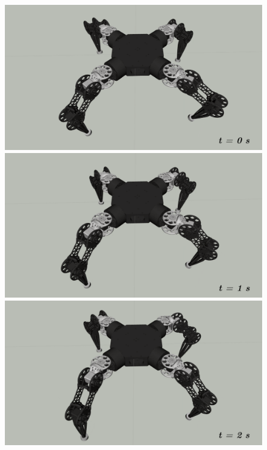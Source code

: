 \begin{figure}[t]
  \centering
  \begin{minipage}[b]{0.32\textwidth}
    \centering
    \includegraphics[clip, width=\linewidth]{./fig/chap4/gait/trot/t_step1.png}
  \end{minipage}
  \begin{minipage}[b]{0.32\textwidth}
    \centering
    \includegraphics[clip, width=\textwidth]{./fig/chap4/gait/trot/t_step2.png}
  \end{minipage}
  \begin{minipage}[b]{0.32\textwidth}
    \centering
    \includegraphics[clip, width=\textwidth]{./fig/chap4/gait/trot/t_step3.png}

\end{minipage}
\end{figure}
